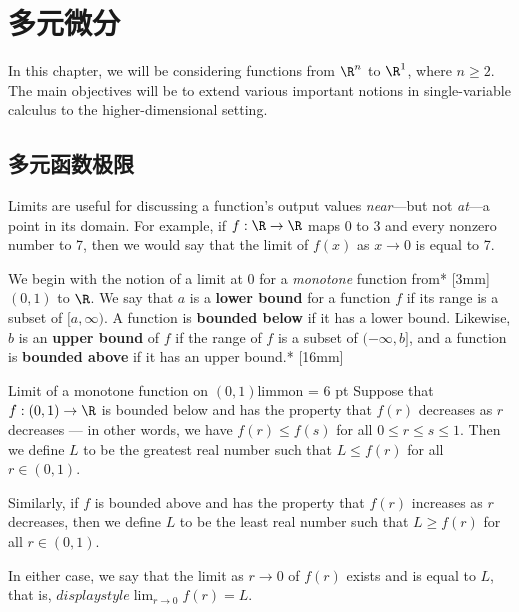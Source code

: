 \documentclass[indent]{watsonbook}
\begin{document}
{\chapter{多元微分}

In this chapter, we will be considering functions from $\R^n$ to
$\R^1$, where $n \geq 2$. The main objectives will be to extend
various important notions in single-variable calculus to the
higher-dimensional setting.

\section{多元函数极限} \label{sec:limits}

Limits are useful for discussing a function's output values
\textit{near}---but not \textit{at}---a point in its domain. For
example, if $f:\R \to \R$ maps 0 to 3 and every nonzero number to 7,
then we would say that the limit of $f(x)$ as $x\to 0$ is equal to 7.

We begin with the notion of a limit at 0 for a \textit{monotone}
function from* [3mm]
$(0,1)$ to $\R$. We say that $a$ is a \textbf{lower bound} for a
function $f$ if its range is a subset of $[a,\infty)$. A function is
\textbf{bounded below} if it has a lower bound. Likewise, $b$ is an
\textbf{upper bound} of $f$ if the range of $f$ is a subset of $(-\infty,b]$,
and a function is \textbf{bounded above} if it has an upper
bound.* [16mm]

\begin{defn}{Limit of a monotone function on $(0,1)$}{limmon} \parskip = 6 pt
  Suppose that $f:(0,1) \to \R$ is bounded below and has the property
  that $f(r)$ decreases as $r$ decreases --- in other words,
  we have $f(r) \leq f(s)$ for all $0 \leq r \leq s \leq 1$. Then we define
  $L$ to be the greatest real number such that $L \leq f(r)$ for all
  $r\in (0,1)$.

  Similarly, if $f$ is bounded above and has the property that $f(r)$
  increases as $r$ decreases, then we define $L$ to be the least real
  number such that $L \geq f(r)$ for all $r \in (0,1)$.

  In either case, we say that the limit as $r\to0$ of $f(r)$ exists
  and is equal to $L$, that is,
  ${d}isplaystyle{\lim_{r\to 0} f(r) = L}$.
\end{defn}

}
\end{document}
